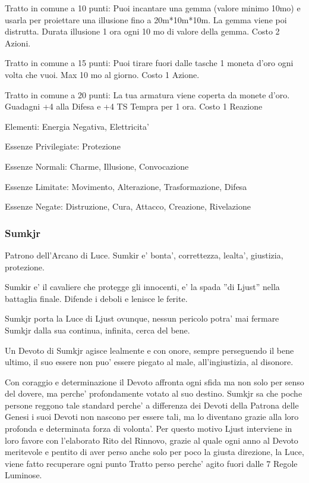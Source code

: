 \documentclass[a4paper,11pt,twoside,openany]{book}
\begin{document}
{Tratto in comune a 10 punti: Puoi incantare una gemma (valore minimo 10mo) e usarla per proiettare una illusione fino a 20m{*}10m{*}10m. La gemma viene poi distrutta. Durata illusione 1 ora ogni 10 mo di valore della gemma. Costo 2 Azioni.

Tratto in comune a 15 punti: Puoi tirare fuori dalle tasche 1 moneta d'oro ogni volta che vuoi. Max 10 mo al giorno. Costo 1 Azione.

Tratto in comune a 20 punti: La tua armatura viene coperta da monete d'oro. Guadagni +4 alla Difesa e +4 TS Tempra per 1 ora. Costo 1 Reazione 

\bigskip

Elementi: Energia Negativa, Elettricita'

\bigskip

Essenze Privilegiate: Protezione

Essenze Normali: Charme, Illusione, Convocazione

Essenze Limitate: Movimento, Alterazione, Trasformazione, Difesa

Essenze Negate: Distruzione, Cura, Attacco, Creazione, Rivelazione

\subsubsection{Sumkjr}

\label{sumkjr}

Patrono dell'Arcano di Luce. Sumkir e' bonta', correttezza, lealta', giustizia, protezione.

Sumkir e' il cavaliere che protegge gli innocenti, e' la spada ''di Ljust'' nella battaglia finale. Difende i deboli e lenisce le ferite.

Sumkjr porta la Luce di Ljust ovunque, nessun pericolo potra' mai fermare Sumkjr dalla sua continua, infinita, cerca del bene.

Un Devoto di Sumkjr agisce lealmente e con onore, sempre perseguendo il bene ultimo, il suo essere non puo' essere piegato al male, all'ingiustizia, al disonore.

Con coraggio e determinazione il Devoto affronta ogni sfida ma non solo per senso del dovere, ma perche' profondamente votato al suo destino. Sumkjr sa che poche persone reggono tale standard perche' a differenza dei Devoti della Patrona delle Genesi i suoi Devoti non nascono per essere tali, ma lo diventano grazie alla loro profonda e determinata forza di volonta'. Per questo motivo Ljust interviene in loro favore con l'elaborato Rito del Rinnovo, grazie al quale ogni anno al Devoto meritevole e pentito di aver perso anche solo per poco la giusta direzione, la Luce, viene fatto recuperare ogni punto Tratto perso perche' agito fuori dalle 7 Regole Luminose.

}
\end{document}
